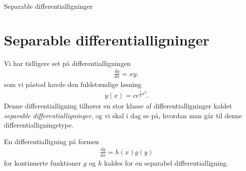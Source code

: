 \begin{center}
\Huge
Separable differentialligninger
\end{center}


\section*{Separable differentialligninger}

Vi har tidligere set på differentialligningen
\begin{align*}
	\frac{dy}{dx} =xy,
\end{align*}
som vi påstod havde den fuldstændige løsning
\begin{align*}
y(x) = ce^{\frac{1}{2}x^2}.
\end{align*}
Denne differentialligning tilhører en stor klasse af differentialligninger kaldet \textit{separable differentialligninger}, og vi skal i dag se på, hvordan man går til denne differentialligningstype.
\begin{defn}
	En differentialligning på formen
	\begin{align*}
		\frac{dy}{dx} = h(x)g(y)
 	\end{align*}		
 	for kontinuerte funktioner $g$ og $h$ kaldes for en separabel differentialligning. 
\end{defn}

